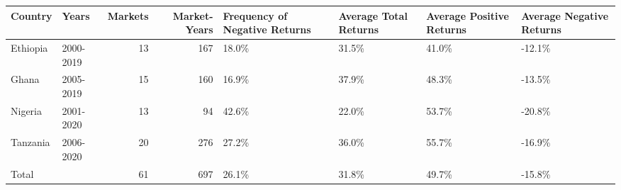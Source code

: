 \begin{table}[ht]
\centering
\begin{tabular}{llrrllll}
  \hline
Country & Years & Markets & Market-Years & Frequency of Negative Returns & Average Total Returns & Average Positive Returns & Average Negative Returns \\ 
  \hline
Ethiopia & 2000-2019 &  13 & 167 & 18.0\% & 31.5\% & 41.0\% & -12.1\% \\ 
  Ghana & 2005-2019 &  15 & 160 & 16.9\% & 37.9\% & 48.3\% & -13.5\% \\ 
  Nigeria & 2001-2020 &  13 &  94 & 42.6\% & 22.0\% & 53.7\% & -20.8\% \\ 
  Tanzania & 2006-2020 &  20 & 276 & 27.2\% & 36.0\% & 55.7\% & -16.9\% \\ 
  Total &   &  61 & 697 & 26.1\% & 31.8\% & 49.7\% & -15.8\% \\ 
   \hline
\end{tabular}
\end{table}
